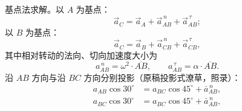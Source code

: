 \begin{solution}
基点法求解。以 $A$ 为基点：
\begin{equation}\label{eq:A5-baseA}
\vec a_C=\vec a_A+\vec a_{AB}^{\,n}+\vec a_{AB}^{\,\tau};
\end{equation}
以 $B$ 为基点：
\begin{equation}\label{eq:A5-baseB}
\vec a_C=\vec a_B+\vec a_{CB}^{\,n}+\vec a_{CB}^{\,\tau},
\end{equation}%
其中相对转动的法向、切向加速度大小为
\begin{equation}\label{eq:A5-rel}
a_{AB}^{\,n}=\omega^{2}\cdot\overline{AB},\qquad
a_{AB}^{\,\tau}=\alpha\cdot\overline{AB}.
\end{equation}
沿 $AB$ 方向与沿 $BC$ 方向分别投影（原稿投影式潦草，照录）：
\begin{equation}\label{eq:A5-proj}
\begin{aligned}
a_{AB}\cos 30^\circ&=a_{BC}\cos 45^\circ+\bar{a}_{AB}^{\,n},\\
a_{BC}\cos 30^\circ&=a_{BC}\cos 45^\circ+\bar{a}_{AB}^{\,n},
\end{aligned}
\end{equation}%
\end{solution}

